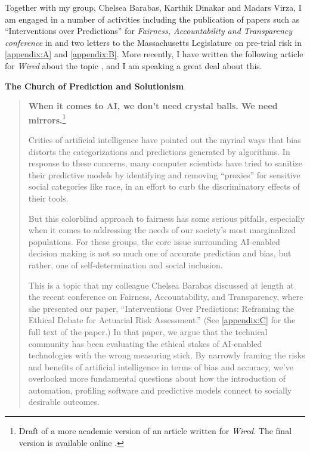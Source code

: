 Together with my group, Chelsea Barabas, Karthik Dinakar and Madars Virza, I am engaged in a number of activities including the publication of papers such as ``Interventions over Predictions'' for \textit{Fairness, Accountability and Transparency conference} in \cite{barabas_interventions_nodate} and two letters to the Massachusetts Legislature on pre-trial risk in \autoref{appendix:A} and \autoref{appendix:B}. More recently, I have written the following article for \emph{Wired} about the topic \cite{ItoWiredAI}, and I am speaking a great deal about this.

\textbf{The Church of Prediction and Solutionism}

\begin{quote}
\textbf{When it comes to \ac{AI}, we don't need crystal balls. We need mirrors.}\footnote{Draft of a more academic version of an article written for \emph{Wired}. The final version is available online \cite{ItoWiredAI}.}
 
Critics of artificial intelligence have pointed out the myriad ways that bias distorts the categorizations and predictions generated by algorithms. In response to these concerns, many computer scientists have tried to sanitize their predictive models by identifying and removing ``proxies'' for sensitive social categories like race, in an effort to curb the discriminatory effects of their tools. 

But this colorblind approach to fairness has some serious pitfalls, especially when it comes to addressing the needs of our society's most marginalized populations. For these groups, the core issue surrounding \ac{AI}-enabled decision making is not so much one of accurate prediction and bias, but rather, one of self-determination and social inclusion.
 
This is a topic that my colleague Chelsea Barabas discussed at length at the recent conference on Fairness, Accountability, and Transparency, where she presented our paper, ``Interventions Over Predictions: Reframing the Ethical Debate for Actuarial Risk Assessment.'' (See \autoref{appendix:C} for the full text of the paper.) In that paper, we argue that the technical community has been evaluating the ethical stakes of \ac{AI}-enabled technologies with the wrong measuring stick. By narrowly framing the risks and benefits of artificial intelligence in terms of bias and accuracy, we've overlooked more fundamental questions about how the introduction of automation, profiling software and predictive models connect to socially desirable outcomes.
 

\end{quote}
